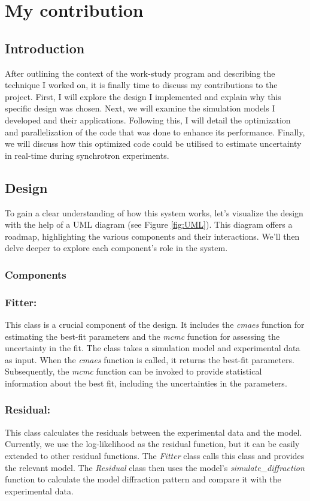 \section{My contribution}

\subsection{Introduction}

After outlining the context of the work-study program and describing the technique I worked
on, it is finally time to discuss my contributions to the project. First, I will explore 
the design I implemented and explain why this specific design was chosen. Next, we will 
examine the simulation models I developed and their applications. Following this, I will 
detail the optimization and parallelization of the code that was done to enhance its performance. 
Finally, we will discuss how this optimized code could be utilised to estimate uncertainty
in real-time during synchrotron experiments.

\subsection{Design}

To gain a clear understanding of how this system works, let's visualize the design with the help of a 
UML diagram (see Figure \ref{fig:UML}). This diagram offers a roadmap, highlighting the various components and their interactions.
 We'll then delve deeper to explore each component's role in the system.
\subsubsection{Components}

\subsubsection*{\textbf{Fitter:}}
This class is a crucial component of the design. It includes the \textit{cmaes} function for estimating the
best-fit parameters and the \textit{mcmc} function for assessing the uncertainty in the fit. The class takes
a simulation model and experimental data as input. When the \textit{cmaes} function is called, it returns the best-fit parameters.
Subsequently, the \textit{mcmc} function can be invoked to provide statistical information about the best
fit, including the uncertainties in the parameters.

\subsubsection*{\textbf{Residual:}}
This class calculates the residuals between the experimental data and the model.
Currently, we use the log-likelihood as the residual function, but it can be easily extended
to other residual functions. The \textit{Fitter} class calls this class and provides the relevant model.
The \textit{Residual} class then uses the model's \textit{simulate\_diffraction} function to calculate
the model diffraction pattern and compare it with the experimental data.

